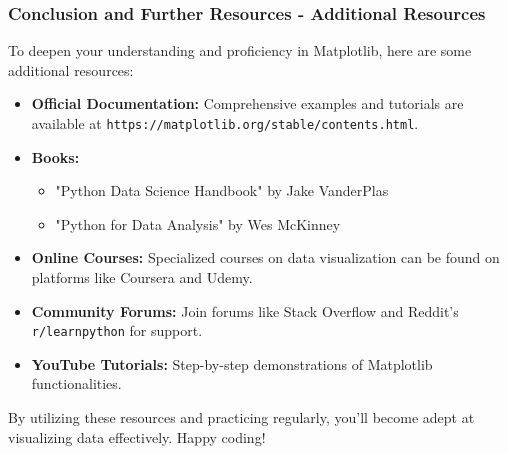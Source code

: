 \documentclass{beamer}
\begin{document}
\begin{frame}[fragile]
    \frametitle{Conclusion and Further Resources - Additional Resources}
    To deepen your understanding and proficiency in Matplotlib, here are some additional resources:

    \begin{itemize}
        \item \textbf{Official Documentation:} Comprehensive examples and tutorials are available at \texttt{https://matplotlib.org/stable/contents.html}.
        \item \textbf{Books:}
        \begin{itemize}
            \item "Python Data Science Handbook" by Jake VanderPlas
            \item "Python for Data Analysis" by Wes McKinney
        \end{itemize}
        \item \textbf{Online Courses:} Specialized courses on data visualization can be found on platforms like Coursera and Udemy.
        \item \textbf{Community Forums:} Join forums like Stack Overflow and Reddit's \texttt{r/learnpython} for support.
        \item \textbf{YouTube Tutorials:} Step-by-step demonstrations of Matplotlib functionalities.
    \end{itemize}

    By utilizing these resources and practicing regularly, you'll become adept at visualizing data effectively. Happy coding!
\end{frame}
\end{document}
